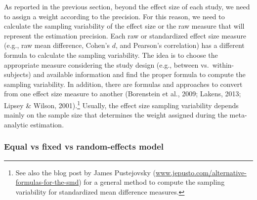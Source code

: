 \documentclass[
  man,floatsintext]{apa6}
\begin{document}
As reported in the previous section, beyond the effect size of each study, we need to assign a weight according to the precision. For this reason, we need to calculate the sampling variability of the effect size or the raw measure that will represent the estimation precision. Each raw or standardized effect size measure (e.g., raw mean difference, Cohen's \(d\), and Pearson's correlation) has a different formula to calculate the sampling variability. The idea is to choose the appropriate measure considering the study design (e.g., between vs.~within-subjects) and available information and find the proper formula to compute the sampling variability. In addition, there are formulas and approaches to convert from one effect size measure to another (Borenstein et al., 2009; Lakens, 2013; Lipsey \& Wilson, 2001).\footnote{See also the blog post by James Pustejovsky (\href{https://www.jepusto.com/alternative-formulas-for-the-smd/}{www.jepusto.com/alternative-formulas-for-the-smd}) for a general method to compute the sampling variability for standardized mean difference measures.} Usually, the effect size sampling variability depends mainly on the sample size that determines the weight assigned during the meta-analytic estimation.

\hypertarget{equal-vs-fixed-vs-random-effects-model}{%
\subsubsection{Equal vs fixed vs random-effects model}\label{equal-vs-fixed-vs-random-effects-model}}
\end{document}
